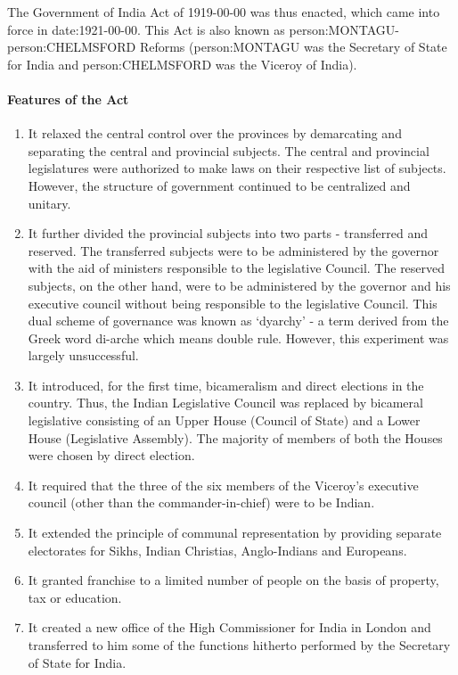The Government of India Act of 1919-00-00 was thus enacted, which came into force in \gls{date:1921-00-00}. This Act is also known as \gls{person:MONTAGU}-\gls{person:CHELMSFORD} Reforms (\gls{person:MONTAGU} was the Secretary of State for India and \gls{person:CHELMSFORD} was the Viceroy of India).

\paragraph{Features of the Act}
\begin{enumerate}
  \item It relaxed the central control over the provinces by demarcating and separating the central and provincial subjects. The central and provincial legislatures were authorized to make laws on their respective list of subjects. However, the structure of government continued to be
  centralized and unitary.
  \item It further divided the provincial subjects into two parts - transferred and reserved. The transferred subjects were to be administered by the governor with the aid of ministers responsible to the legislative Council. The reserved subjects, on the other hand, were to be administered by the governor and his executive council without being responsible to the legislative Council. This dual scheme of governance was known as
   `dyarchy' - a term derived from the Greek word di-arche which means double rule. However, this experiment was largely unsuccessful.
  \item It introduced, for the first time, bicameralism and direct elections in the country. Thus, the Indian Legislative Council was replaced by bicameral legislative consisting of an Upper House (Council of State) and a Lower House (Legislative Assembly). The majority of members of both the Houses were chosen by direct election.
  \item It required that the three of the six members of the Viceroy's executive council (other than the commander-in-chief) were to be Indian.
  \item It extended the principle of communal representation by providing separate electorates for Sikhs, Indian Christias, Anglo-Indians and Europeans.
  \item It granted franchise to a limited number of people on the basis of property, tax or education.
  \item It created a new office of the High Commissioner for India in London and transferred to him some of the functions hitherto performed by the Secretary of State for India.

\end{enumerate}
